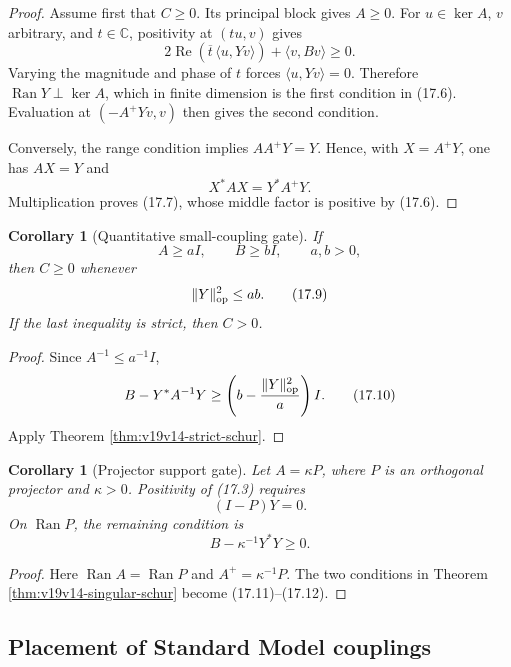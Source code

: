 \documentclass[11pt]{article}
\newtheorem{corollary}[theorem]{Corollary}
\theoremstyle{remark}
\begin{document}
\begin{proof}
Assume first that \(C\geq0\).  Its principal block gives \(A\geq0\).
For \(u\in\ker A\), \(v\) arbitrary, and \(t\in\mathbb C\), positivity at
\((tu,v)\) gives
\[
 2\operatorname{Re}\!\left(\overline t\,\langle u,Yv\rangle\right)
 +\langle v,Bv\rangle\geq0.                                   \tag{17.8}
\]
Varying the magnitude and phase of \(t\) forces
\(\langle u,Yv\rangle=0\).  Therefore
\(\operatorname{Ran}Y\perp\ker A\), which in finite dimension is the first
condition in (17.6).  Evaluation at \((-A^+Yv,v)\) then gives the second
condition.

Conversely, the range condition implies \(AA^+Y=Y\).  Hence, with
\(X=A^+Y\), one has \(AX=Y\) and
\[
 X^*AX=Y^*A^+Y.
\]
Multiplication proves (17.7), whose middle factor is positive by (17.6).
\end{proof}

\begin{corollary}[Quantitative small-coupling gate]
\label{cor:v19v14-small}
If
\[
 A\geq aI,\qquad B\geq bI,\qquad a,b>0,
\]
then \(C\geq0\) whenever
\[
 \|Y\|_{\rm op}^2\leq ab.                                     \tag{17.9}
\]
If the last inequality is strict, then \(C>0\).
\end{corollary}

\begin{proof}
Since \(A^{-1}\leq a^{-1}I\),
\[
 B-Y^*A^{-1}Y
 \geq\left(b-\frac{\|Y\|_{\rm op}^2}{a}\right)I.               \tag{17.10}
\]
Apply Theorem \ref{thm:v19v14-strict-schur}.
\end{proof}

\begin{corollary}[Projector support gate]
\label{cor:v19v14-projector}
Let \(A=\kappa P\), where \(P\) is an orthogonal projector and
\(\kappa>0\).  Positivity of (17.3) requires
\[
 (I-P)Y=0.                                                     \tag{17.11}
\]
On \(\operatorname{Ran}P\), the remaining condition is
\[
 B-\kappa^{-1}Y^*Y\geq0.                                      \tag{17.12}
\]
\end{corollary}

\begin{proof}
Here \(\operatorname{Ran}A=\operatorname{Ran}P\) and
\(A^+=\kappa^{-1}P\).  The two conditions in Theorem
\ref{thm:v19v14-singular-schur} become (17.11)--(17.12).
\end{proof}

\subsection{Placement of Standard Model couplings}
\end{document}
